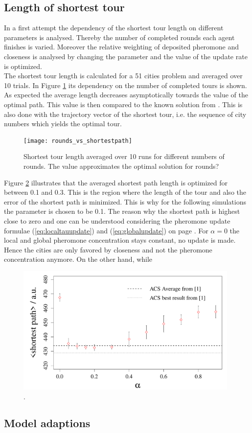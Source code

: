 

\subsection{Length of shortest tour}

In a first attempt the dependency of the shortest tour length on different parameters is analysed. Thereby the number of completed rounds each agent finishes is varied. Moreover the relative weighting of deposited pheromone and closeness is analysed by changing the parameter \beta and the value of the update rate \alpha is optimized. \\
The shortest tour length is calculated for a 51 cities problem and averaged over 10 trials. In Figure \ref{fig:roundsp} its dependency on the number of completed tours is shown. As expected the average length decreases asymptotically towards the value of the optimal path. This value is then compared to the known solution from \cite{web:data}. This is also done with the trajectory vector of the shortest tour, i.e. the sequence of city numbers which yields the optimal tour.

\begin{figure}[h!]
\begin{center}
\texttt{[image: rounds\_vs\_shortestpath]}
\caption{Shortest tour length averaged over 10 runs for different numbers of rounds. The value approximates the optimal solution for  rounds?}
\label{fig:roundsp}
\end{center}
\end{figure}

Figure \ref{fig:alphasp} illustrates that the averaged shortest path length is optimized for \alpha between 0.1 and 0.3. This is the region where the length of the tour and also the error of the shortest path is minimized. This is why for the following simulations the parameter \alpha is chosen to be 0.1. The reason why the shortest path is highest close to zero and one can be understood considering the pheromone update formulae (\ref{eq:localtauupdate}) and (\ref{eq:globalupdate}) on page \pageref{sec:model}. For $\alpha=0$ the local and global pheromone concentration stays constant, no update is made. Hence the cities are only favored by closeness and not the pheromone concentration anymore. On the other hand, while \alpha 
\begin{figure}[h!]
\begin{center}
\includegraphics[width=11cm, height= 6 cm]{alpha_vs_shortestpath}
\caption{.}
\label{fig:alphasp}
\end{center}
\end{figure}

\subsection{Model adaptions}

